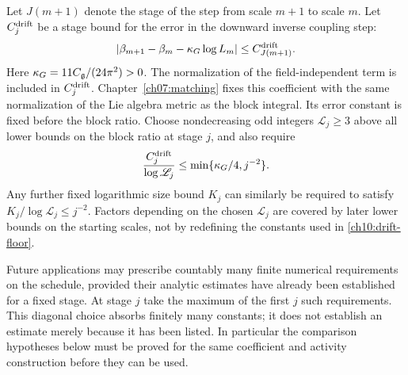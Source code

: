 Let $J(m+1)$ denote the stage of the step from scale $m+1$ to scale $m$.
Let $C_j^{\rm drift}$ be a stage bound for the error in the downward inverse coupling step:
\begin{equation}\label{ch10:step-drift}
 \left|\beta_{m+1}-\beta_m-\kappa_G\log L_m\right|
       \le C^{\rm drift}_{J(m+1)}.
\end{equation}
Here $\kappa_G=11C_{\mathfrak g}/(24\pi^2)>0$. The normalization of the field-independent term is included in $C_j^{\rm drift}$.
Chapter~\ref{ch07:matching} fixes this coefficient with the same
normalization of the Lie algebra metric as the block integral.
Its error constant is fixed before the block ratio. Choose
nondecreasing odd integers $\mathscr L_j\ge3$ above all lower bounds on the block ratio at stage $j$,
and also require
\begin{equation}\label{ch10:drift-floor}
 \frac{C_j^{\rm drift}}{\log\mathscr L_j}
 \le \min\{\kappa_G/4,j^{-2}\}.
\end{equation}
Any further fixed logarithmic size bound $K_j$ can similarly be
required to satisfy $K_j/\log\mathscr L_j\le j^{-2}$.
Factors depending on the chosen $\mathscr L_j$ are covered by later lower bounds on the starting scales, not by redefining the constants used in
\eqref{ch10:drift-floor}.

Future applications may prescribe countably many finite numerical
requirements on the schedule, provided their analytic estimates have already been
established for a fixed stage. At stage $j$ take the maximum of the
first $j$ such requirements. This diagonal choice absorbs finitely many constants;
it does not establish an estimate merely because it has been listed.
In particular the comparison hypotheses below must be proved for the
same coefficient and activity construction before they can be used.


